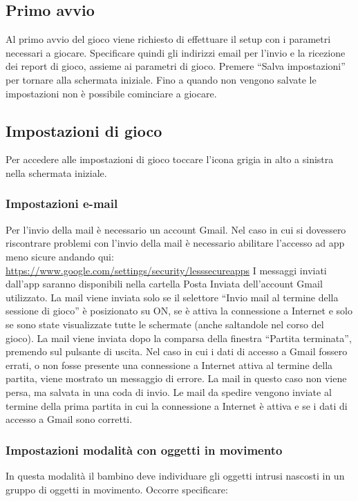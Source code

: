 \subsection{Primo avvio}
Al primo avvio del gioco viene richiesto di effettuare il setup con i parametri necessari a giocare. Specificare quindi gli indirizzi email per l'invio e la ricezione dei report di gioco, assieme ai parametri di gioco. Premere “Salva impostazioni” per tornare alla schermata iniziale. Fino a quando non vengono salvate le impostazioni non è possibile cominciare a giocare.

\subsection{Impostazioni di gioco}
Per accedere alle impostazioni di gioco toccare l'icona grigia in alto a sinistra nella schermata iniziale.

\subsubsection{Impostazioni e-mail}
Per l'invio della mail è necessario un account Gmail. Nel caso in cui si dovessero riscontrare problemi con l'invio della mail è necessario abilitare l'accesso ad app meno sicure andando qui: \url{https://www.google.com/settings/security/lesssecureapps}
I messaggi inviati dall'app saranno disponibili nella cartella Posta Inviata dell'account Gmail utilizzato.
La mail viene inviata solo se il selettore “Invio mail al termine della sessione di gioco” è posizionato su ON, se è attiva la connessione a Internet e solo se sono state visualizzate tutte le schermate (anche saltandole nel corso del gioco).
La mail viene inviata dopo la comparsa della finestra “Partita terminata”, premendo sul pulsante di uscita.
Nel caso in cui i dati di accesso a Gmail fossero errati, o non fosse presente una connessione a Internet attiva al termine della partita, viene mostrato un messaggio di errore. La mail in questo caso non viene persa, ma salvata in una coda di invio. Le mail da spedire vengono inviate al termine della prima partita in cui la connessione a Internet è attiva e se i dati di accesso a Gmail sono corretti.

\subsubsection{Impostazioni modalità con oggetti in movimento}
In questa modalità il bambino deve individuare gli oggetti intrusi nascosti in un gruppo di oggetti in movimento. 
Occorre specificare:

